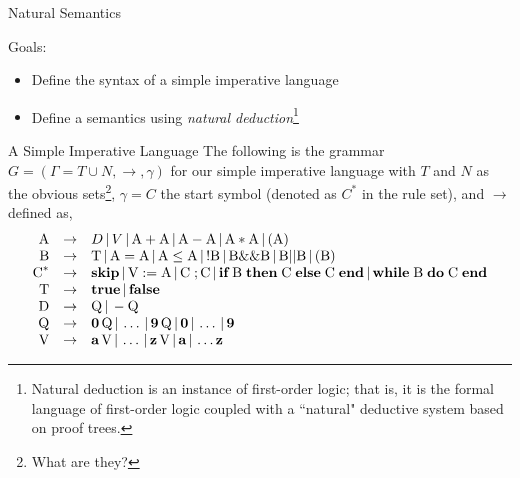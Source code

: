 \documentclass{beamer}
\begin{document}

\begin{frame}{Natural Semantics}

Goals:
\begin{itemize}
\item Define the syntax of a simple imperative language
\item Define a semantics using {\em natural deduction}\footnote{Natural deduction is an
instance of first-order logic; that is, it is the formal language of first-order logic
coupled with a ``natural" deductive system based on proof trees.}
\end{itemize}
\end{frame}


\begin{frame}{A Simple Imperative Language}
\scriptsize
The following is the grammar
 $G=(\Gamma=T\cup N,\rightarrow,\gamma)$ for our simple imperative language with $T$ and $N$ as the obvious sets\footnote{What are they?}, $\gamma=C$ the start symbol (denoted as $C^*$ in the rule set), and $\rightarrow$ defined as,
{
\[
\begin{array}{rcl}
\mbox{A} &\rightarrow& D \,|\, V \,|\, \mbox{A} +\mbox{A} \,|\, \mbox{A} - \mbox{A} \,|\,
	\mbox{A} * \mbox{A}\,|\, ( \mbox{A} )\\

\mbox{B} &\rightarrow& \mbox{T}  \,|\, \mbox{A} = \mbox{A} \,|\,
	\mbox{A} \le \mbox{A} \,|\, ! \mbox{B} \,|\, \mbox{B} \&\& \mbox{B} \,|\,
	\mbox{B} || \mbox{B} \,|\, (\mbox{B})\\

\mbox{C}^* &\rightarrow& \mbox{\bf skip} \,|\, \mbox{V} := \mbox{A} \,|\,\mbox{C}\; ; \mbox{C} \,|\,
	\mbox{\bf if} \; \mbox{B}\; \mbox{\bf then}\;\mbox{C}\; \mbox{\bf else}\; \mbox{C} \; \mbox{\bf end}\,|\,
	\mbox{\bf while}\; \mbox{B}\; \mbox{\bf  do}\; \mbox{C}\; \mbox{\bf end}\\

\mbox{T} &\rightarrow& \mbox{\bf true} \,|\, \mbox{\bf false}\\

\mbox{D} &\rightarrow& \mbox{Q} \,|\, - \mbox{Q}\\

\mbox{Q} &\rightarrow& \mbox{\bf 0}\, \mbox{Q} \,|\, \ldots \,|\,  \mbox{\bf 9} \,\mbox{Q} \,|\, \mbox{\bf 0} \,|\, \ldots\,|\,\mbox{\bf 9}\\

\mbox{V} &\rightarrow& \mbox{\bf a}\,\mbox{V} \,|\, \ldots\,|\, \mbox{\bf z}\,\mbox{V} \,|\, \mbox{\bf a} \,|\, \ldots \mbox{\bf z}
\end{array}
\]
}
\end{frame}
\end{document}
